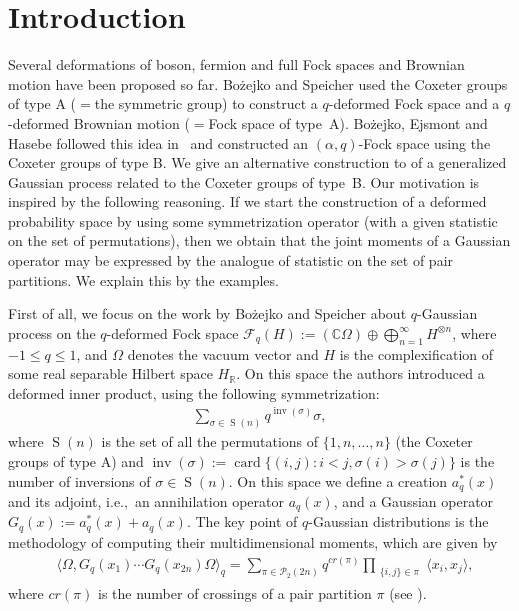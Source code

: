 \documentclass[pdftex]{sigma}
\DeclareMathOperator{\SG}{S}
\numberwithin{equation}{section}
\def\R{{\mathbb R}}
\def\P{\mathcal{P}}
\newcommand{\q}{q}
\begin{document}
\renewcommand{\thefootnote}{\arabic{footnote}}
\setcounter{footnote}{0}

\section{Introduction}

Several deformations of boson, fermion and full Fock spaces and Brownian motion
have been proposed so far. Bo\.zejko and Speicher used the Coxeter groups of type A ($={}$the symmetric group) to
construct a $q$-deformed Fock space and a $q$-deformed Brownian motion \cite{BozejkoSpeicher1991} ($={}$Fock space of type~A).
Bo\.zejko, Ejsmont and Hasebe followed this idea
in~\cite{BozejkoEjsmontHasebe2015} and constructed an
$(\alpha, \q)$-Fock space using the Coxeter groups of type B.
We give an alternative construction to \cite{BozejkoEjsmontHasebe2015} of a generalized Gaussian process related to the Coxeter groups of type~B.
Our motivation is inspired by the following reasoning.
If we start the construction of a deformed probability space by using some symmetrization
operator (with a given statistic on the set of permutations), then we obtain that the joint moments of a Gaussian operator may be expressed by the analogue of statistic on the set of pair partitions.
We explain this by the examples.



First of all, we focus on the work by Bo\.zejko and Speicher about $q$-Gaussian process \cite{BozejkoSpeicher1991} on the $q$-deformed Fock space
$\mathcal{F}_q(H):=(\mathbb{C}\Omega)\oplus\bigoplus_{n=1}^\infty H^{\otimes n} $, where $-1\leq q \leq 1$, and $\Omega$ denotes the vacuum vector and $H$ is the complexification of some real separable
Hilbert space $H_\R$. On this space the authors introduced
a deformed inner product, using the following symmetrization:
\begin{align*}
	\sum_{\sigma\in \SG(n)}q^{\operatorname{inv}(\sigma)}\sigma,
\end{align*}
where $\SG(n)$ is the set of all the permutations of $\{1,n,\dots,n\}$ (the Coxeter groups of type A) and $\operatorname{inv}(\sigma):=\operatorname{card}\{(i,j)\colon i<j,
\sigma(i)>\sigma(j)\}$ is the number of inversions of $\sigma\in
\SG(n)$.
On this space we define a creation $a_q^\ast(x)$ and its adjoint, i.e.,\ an annihilation operator $a_q(x)$, and a Gaussian operator $G_q(x):=a_q^*(x)+a_q(x)$.
The key point of $q$-Gaussian distributions is the methodology of computing their multidimensional moments, which are given by
\begin{equation*}%
	\begin{split}
		&\big\langle\Omega, G_q(x_1)\cdots G_q(x_{2n})\Omega\big\rangle_{q}=
		\sum_{\pi\in \P_{2}(2 n)} q^{cr(\pi)} \prod_{\substack{\{i,j\} \in \pi} }\langle x_i,x_j\rangle,
	\end{split}
\end{equation*}
where $cr(\pi)$ is the number of crossings of a pair partition $\pi$ (see \cite{BozejkoSpeicher1991}).
\end{document}
